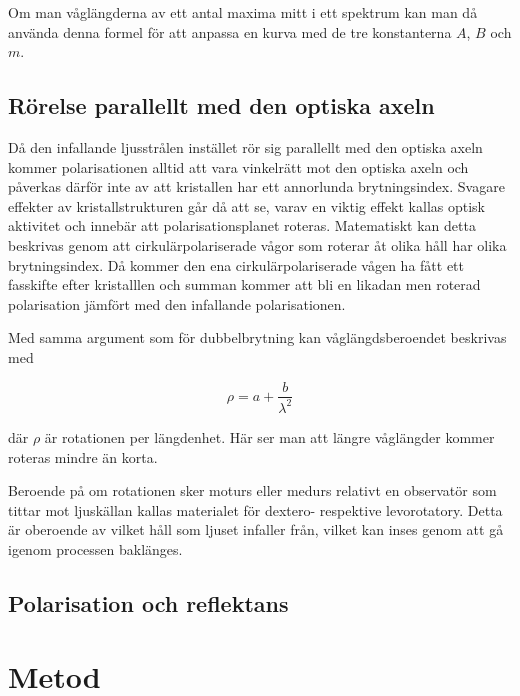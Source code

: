 \documentclass[a4paper]{article}
\begin{document}
Om man våglängderna av ett antal maxima mitt i ett spektrum kan man då använda denna formel för att anpassa en kurva med de tre konstanterna $A$, $B$ och $m$.

\subsection{Rörelse parallellt med den optiska axeln}

Då den infallande ljusstrålen instället rör sig parallellt med den optiska axeln kommer polarisationen alltid att vara vinkelrätt mot den optiska axeln och påverkas därför inte av att kristallen har ett annorlunda brytningsindex. Svagare effekter av kristallstrukturen går då att se, varav en viktig effekt kallas optisk aktivitet och innebär att polarisationsplanet roteras. Matematiskt kan detta beskrivas genom att cirkulärpolariserade vågor som roterar åt olika håll har olika brytningsindex. Då kommer den ena cirkulärpolariserade vågen ha fått ett fasskifte efter kristalllen och summan kommer att bli en likadan men roterad polarisation jämfört med den infallande polarisationen. \cite{labManual} \cite[pp.~387--391]{pearsonIntroOpt}

Med samma argument som för dubbelbrytning kan våglängdsberoendet beskrivas med \cite{labManual}

\begin{equation}
	\rho = a + \frac{b}{\lambda^2}
\end{equation}

där $\rho$ är rotationen per längdenhet. Här ser man att längre våglängder kommer roteras mindre än korta.

Beroende på om rotationen sker moturs eller medurs relativt en observatör som tittar mot ljuskällan kallas materialet för dextero- respektive levorotatory. Detta är oberoende av vilket håll som ljuset infaller från, vilket kan inses genom att gå igenom processen baklänges. \cite{labManual} \cite[p.~387]{pearsonIntroOpt}

\subsection{Polarisation och reflektans}



\section{Metod}
  
\end{document}

